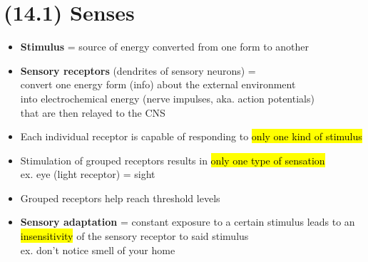 \documentclass[a4paper,12pt]{article}
\begin{document}
\section{(14.1) Senses}
\begin{itemize}
    \item{\textbf{Stimulus} = source of energy converted from one form to another}
    \item{\textbf{Sensory receptors} (dendrites of sensory neurons) = \\ convert one energy form (info) about the external environment \\ into electrochemical energy (nerve impulses, aka. action potentials) \\ that are then relayed to the CNS}
    \item{Each individual receptor is capable of responding to \hl{only one kind of stimulus}}
    \item{Stimulation of grouped receptors results in \hl{only one type of sensation} \\ ex. eye (light receptor) = sight}
    \item{Grouped receptors help reach threshold levels}
    \item{\textbf{Sensory adaptation} = constant exposure to a certain stimulus leads to an \hl{insensitivity} of the sensory receptor to said stimulus \\ ex. don't notice smell of your home}
\end{itemize}
\end{document}
